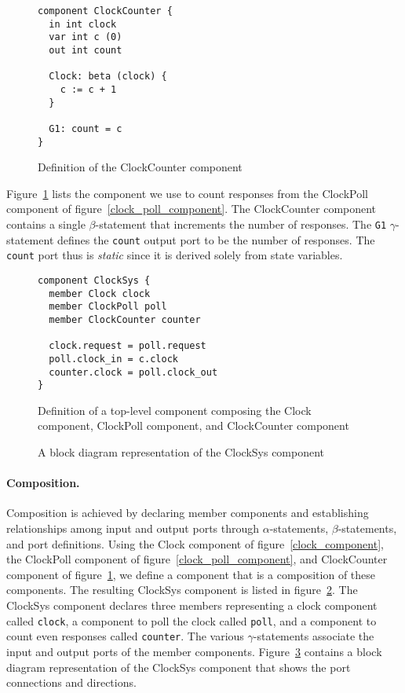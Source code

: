 \begin{figure}
\begin{verbatim}
component ClockCounter {
  in int clock
  var int c (0)
  out int count

  Clock: beta (clock) {
    c := c + 1
  }
  
  G1: count = c
}
\end{verbatim}
\caption{Definition of the ClockCounter component\label{clock_counter_component}}
\end{figure}

Figure~\ref{clock_counter_component} lists the component we use to count responses from the ClockPoll component of figure~\ref{clock_poll_component}.
The ClockCounter component contains a single $\beta$-statement that increments the number of responses.
The \verb+G1+ $\gamma$-statement defines the \verb+count+ output port to be the number of responses.
The \verb+count+ port thus is \emph{static} since it is derived solely from state variables.

\begin{figure}
\begin{verbatim}
component ClockSys {
  member Clock clock
  member ClockPoll poll
  member ClockCounter counter

  clock.request = poll.request
  poll.clock_in = c.clock
  counter.clock = poll.clock_out
}
\end{verbatim}
\caption{Definition of a top-level component composing the Clock component, ClockPoll component, and ClockCounter component\label{clocksys_component}}
\end{figure}

\begin{figure}
{

\centerline{\box\graph}
}
\caption{A block diagram representation of the ClockSys component\label{clocksys_component_graphic}}
\end{figure}

\paragraph{Composition.}
Composition is achieved by declaring member components and establishing relationships among input and output ports through $\alpha$-statements, $\beta$-statements, and port definitions.
Using the Clock component of figure~\ref{clock_component}, the ClockPoll component of figure~\ref{clock_poll_component}, and ClockCounter component of figure~\ref{clock_counter_component}, we define a component that is a composition of these components.
The resulting ClockSys component is listed in figure~\ref{clocksys_component}.
The ClockSys component declares three members representing a clock component called \verb+clock+, a component to poll the clock called \verb+poll+, and a component to count even responses called \verb+counter+.
The various $\gamma$-statements associate the input and output ports of the member components.
Figure~\ref{clocksys_component_graphic} contains a block diagram representation of the ClockSys component that shows the port connections and directions.

